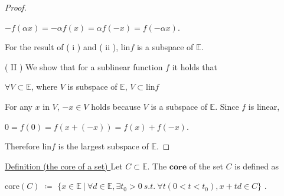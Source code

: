 \documentclass[a4paper,11pt]{jsarticle}
\begin{document}
\begin{proof}
  \begin{center}
    $-f(\alpha x) = - \alpha f(x) = \alpha f(-x) = f(- \alpha x)$.
  \end{center}

  For the result of ( $\mathrm{i}$ ) and ( $\mathrm{ii}$ ), $\text{lin}f$ is a subspace of $\mathbb{E}$.

  ( $\mathrm{II}$ ) We show that for a sublinear function $f$ it holds that

  \begin{center}
    $\forall V \subset \mathbb{E}$, where $V$ is subspace of $\mathbb{E}$, $V \subset \text{lin}f$
  \end{center}

  For any $x$ in $V$, $-x \in V$ holds because $V$ is a subspace of $\mathbb{E}$. Since $f$ is linear,

  \begin{center}
    $0 = f(0) = f(x + (-x)) = f(x) + f(-x)$.
  \end{center}

  Therefore $\text{lin}f$ is the largest subspace of $\mathbb{E}$.
\end{proof}

\begin{center}
\end{center}

\begin{itembox}[l]{\underline{Definition (the core of a set) }}
  Let $C \subset \mathbb{E}$. The $\textbf{core}$ of the set $C$ is defined as

  \begin{center}
    $\text{core} (C)$ $\coloneqq$ $\{x \in \mathbb{E} \:|\: \forall d \in \mathbb{E}, \exists t_0 > 0 \:s.t.\: \forall t (0<t<t_0), x+td \in C \}$ .
  \end{center}
\end{itembox}
\end{document}
